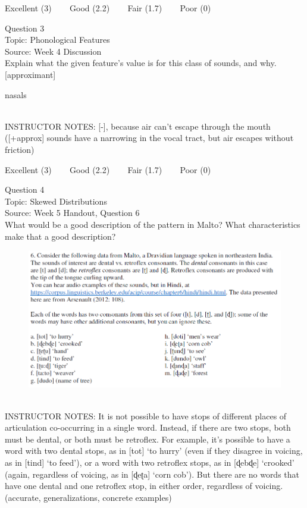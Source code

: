 \documentclass[12pt]{article}
\begin{document}
\vfill
Excellent (3) ~~~ Good (2.2) ~~~ Fair (1.7) ~~~ Poor (0)
\newpage

{\large Question 3}\\

Topic: Phonological Features\\
Source: Week 4 Discussion\\

Explain what the given feature’s value is for this class of sounds, and why.\\

{[approximant]}

nasals


~\\
INSTRUCTOR NOTES: [-], because air can't escape through the mouth ([+approx] sounds have a narrowing in the vocal tract, but air escapes without friction)


\vfill
Excellent (3) ~~~ Good (2.2) ~~~ Fair (1.7) ~~~ Poor (0)
\newpage

{\large Question 4}\\

Topic: Skewed Distributions\\
Source: Week 5 Handout, Question 6\\

What would be a good description of the pattern in Malto? What characteristics make that a good description?\\

\begin{figure}[H]
\includegraphics{../images/malto.png}
\end{figure}

~\\
INSTRUCTOR NOTES: It is not possible to have stops of different places of articulation co-occurring in a single word. Instead, if there are two stops, both must be dental, or both must be retroflex. For example, it’s possible to have a word with two dental stops, as in [tot] ‘to hurry’ (even if they disagree in voicing, as in [tind] ‘to feed’), or a word with two retroflex stops, as in [ɖebɖe] ‘crooked’ (again, regardless of voicing, as in [ɖeʈa] ‘corn cob’). But there are no words that have one dental and one retroflex stop, in either order, regardless of voicing. (accurate, generalizations, concrete examples)
\end{document}
